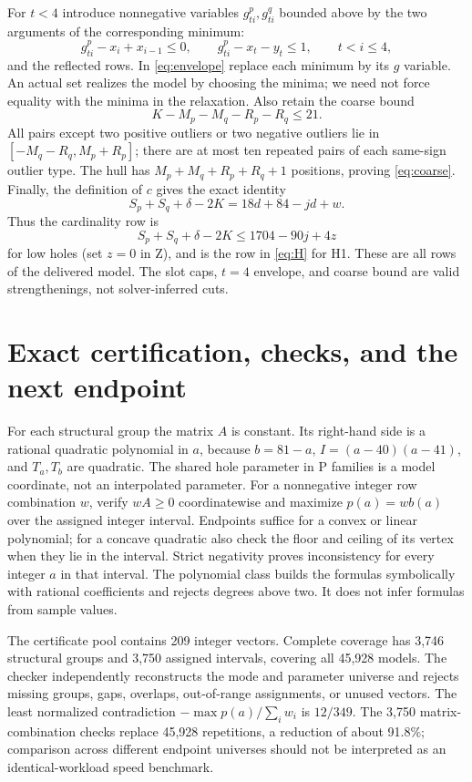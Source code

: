 \documentclass[11pt,a4paper]{article}
\begin{document}
For $t<4$ introduce nonnegative variables $g^p_{ti},g^q_{ti}$ bounded
above by the two arguments of the corresponding minimum:
\[
 g^p_{ti}-x_i+x_{i-1}\le0,\qquad g^p_{ti}-x_t-y_t\le1,
 \qquad t<i\le4,
\]
and the reflected rows. In \eqref{eq:envelope} replace each minimum by
its $g$ variable. An actual set realizes the model by choosing the minima;
we need not force equality with the minima in the relaxation.
Also retain the coarse bound
\begin{equation}\label{eq:coarse}
 K-M_p-M_q-R_p-R_q\le21.
\end{equation}
All pairs except two positive outliers or two negative outliers lie in
$[-M_q-R_q,M_p+R_p]$; there are at most ten repeated pairs of each
same-sign outlier type. The hull has $M_p+M_q+R_p+R_q+1$ positions,
proving \eqref{eq:coarse}.
Finally, the definition of $c$ gives the exact identity
\[
 S_p+S_q+\delta-2K=18d+84-jd+w.
\]
Thus the cardinality row is
\begin{equation}\label{eq:cardinality}
 S_p+S_q+\delta-2K\le1704-90j+4z
\end{equation}
for low holes (set $z=0$ in Z), and is the row in \eqref{eq:H} for H1.
These are all rows of the delivered model. The slot caps, $t=4$ envelope,
and coarse bound are valid strengthenings, not solver-inferred cuts.

\section{Exact certification, checks, and the next endpoint}
For each structural group the matrix $A$ is constant. Its right-hand
side is a rational quadratic polynomial in $a$, because
$b=81-a$, $I=(a-40)(a-41)$, and $T_a,T_b$ are quadratic.
The shared hole parameter in P families is a model coordinate, not an
interpolated parameter. For a nonnegative integer row combination $w$,
verify $wA\ge0$ coordinatewise and maximize $p(a)=wb(a)$ over the assigned
integer interval. Endpoints suffice for a convex or linear polynomial;
for a concave quadratic also check the floor and ceiling of its vertex
when they lie in the interval. Strict negativity proves inconsistency
for every integer $a$ in that interval.
The polynomial class builds the formulas symbolically with rational
coefficients and rejects degrees above two. It does not infer formulas
from sample values.

The certificate pool contains 209 integer vectors. Complete coverage has
3,746 structural groups and 3,750 assigned intervals, covering all 45,928
models. The checker independently reconstructs the mode and parameter
universe and rejects missing groups, gaps, overlaps, out-of-range
assignments, or unused vectors. The least normalized contradiction
$-\max p(a)/\sum_iw_i$ is $12/349$.
The 3,750 matrix-combination checks replace 45,928 repetitions, a reduction
of about 91.8\%; comparison across different endpoint universes should
not be interpreted as an identical-workload speed benchmark.
\end{document}
